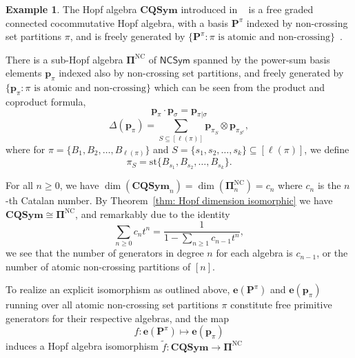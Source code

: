 \documentclass[11pt]{amsart}
\theoremstyle{definition}
\newtheorem{example}[theorem]{Example}
\numberwithin{equation}{section}
\begin{document}
\begin{example}
    The Hopf algebra $\mathbf{CQSym}$ introduced in ~\cite{NT05} is a free graded connected cocommutative Hopf algebra, with a basis $\mathbf{P}^{\pi}$ indexed by non-crossing set partitions $\pi$, and is freely generated by $\{\mathbf{P}^{\pi}:\pi \text{ is atomic and non-crossing}\}$~\cite[Proposition 5.2]{NT05}.

    There is a sub-Hopf algebra $\mathbf{\Pi}^{\mathrm{NC}}$ of $\mathsf{NCSym}$ spanned by the power-sum basis elements $\mathbf{p}_{\pi}$ indexed also by non-crossing set partitions, and freely generated by $\{\mathbf{p}_{\pi}:\pi \text{ is atomic and non-crossing}\}$ which can be seen from the product and coproduct formula,
    \[
    \mathbf{p}_{\pi}\cdot \mathbf{p}_{\sigma} = \mathbf{p}_{\pi | \sigma}
    \]
    \[
    \Delta (\mathbf{p}_{\pi}) = \sum_{S \subseteq [\ell (\pi)]} \mathbf{p}_{\pi_S} \otimes \mathbf{p}_{\pi_{S^c}},
    \]
    where for $\pi = \{B_1,B_2, \ldots, B_{\ell(\pi)}\}$ and $S = \{s_1,s_2, \ldots, s_k\} \subseteq [\ell(\pi)]$, we define 
    \[
    \pi_{S} = \mathrm{st}\{B_{s_1},B_{s_2}, \ldots, B_{s_k}\}.
    \]
    
    For all $n \geq 0$, we have $\dim(\mathbf{CQSym}_n) = \dim(\mathbf{\Pi}^{\mathrm{NC}}_n) = c_n$ where $c_n$ is the $n$-th Catalan number. By Theorem~\ref{thm: Hopf dimension isomorphic} we have $\mathbf{CQSym} \cong \mathbf{\Pi}^{\mathrm{NC}}$, and remarkably due to the identity 
    \[
    \sum_{n \geq 0}c_nt^n = \frac{1}{1-\sum_{n \geq 1}c_{n-1}t^n},
    \]
    we see that the number of generators in degree $n$ for each algebra is $c_{n-1}$, or the number of atomic non-crossing partitions of $[n]$. 

    To realize an explicit isomorphism as outlined above, $\mathbf{e}(\mathbf{P}^{\pi})$ and $\mathbf{e}(\mathbf{p}_{\pi})$ running over all atomic non-crossing set partitions $\pi$ constitute free primitive generators for their respective algebras, and the map
    \[
    f:\mathbf{e}(\mathbf{P}^{\pi}) \mapsto \mathbf{e}(\mathbf{p}_{\pi})
    \]
    induces a Hopf algebra isomorphism $\tilde{f}:\mathbf{CQSym} \to \mathbf{\Pi}^{\mathrm{NC}}$
\end{example}
\end{document}

